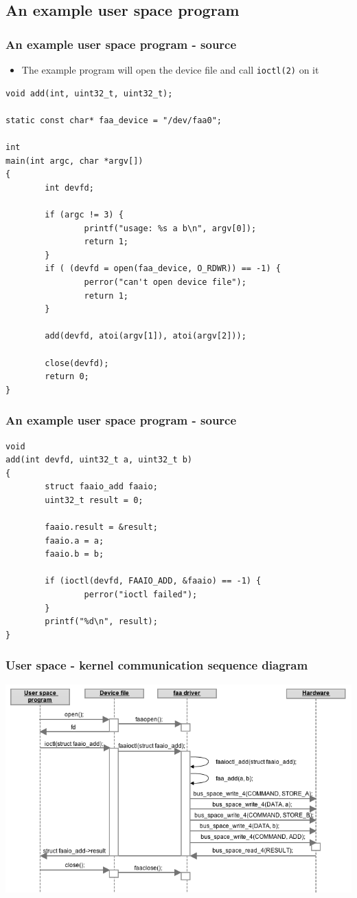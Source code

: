 \documentclass[dvipsnames,table]{beamer}
\begin{document}
\subsection{An example user space program}

\begin{frame}[fragile]
\frametitle{An example user space program - source}
\begin{itemize}
	\item The example program will open the device file and call {\tt ioctl(2)} on it
\end{itemize}
\begin{lstlisting}
void add(int, uint32_t, uint32_t);

static const char* faa_device = "/dev/faa0";

int
main(int argc, char *argv[])
{
        int devfd;

        if (argc != 3) {
                printf("usage: %s a b\n", argv[0]);
                return 1;
        }
        if ( (devfd = open(faa_device, O_RDWR)) == -1) {
                perror("can't open device file");
                return 1;
        }

        add(devfd, atoi(argv[1]), atoi(argv[2]));

        close(devfd);
        return 0;
}
\end{lstlisting}
\end{frame}

\begin{frame}[fragile]
\frametitle{An example user space program - source}
\begin{lstlisting}
void
add(int devfd, uint32_t a, uint32_t b)
{
        struct faaio_add faaio;
        uint32_t result = 0;

        faaio.result = &result;
        faaio.a = a;
        faaio.b = b;

        if (ioctl(devfd, FAAIO_ADD, &faaio) == -1) {
                perror("ioctl failed");
        }
        printf("%d\n", result);
}
\end{lstlisting}
\end{frame}

\begin{frame}
\frametitle{User space - kernel communication sequence diagram}
\vspace*{-0.8cm}
\begin{center}
\includegraphics[scale=0.45]{basicflow.png}
\end{center}
\end{frame}
\end{document}
